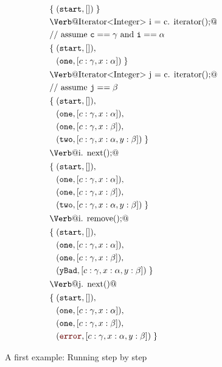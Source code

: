 \documentclass{sigplanconf} %
\newcommand{\error}{\ensuremath{\textcolor{darkred}{\mathtt{error}}}\xspace}
\newcommand{\start}{\ensuremath{\mathtt{start}}\xspace}
\theoremstyle{definition}
\theoremstyle{remark}
\begin{document}
\begin{figure}
{\def\s#1{\text{\Verb@#1@}}
 \def\m#1{\PY{n+na}{#1}}
 \def\t#1{\mathtt{#1}}
\begin{align*}
&\{\;(\start,[])\;\} \\
&\s{Iterator<Integer> i = c.\m{iterator}();} \\
&\text{// assume ${\tt c}==\gamma$ and ${\tt i}==\alpha$ } \\
& \begin{aligned}
  \{\;&(\start,[]),\\
      &(\t{one},[c:\gamma,x:\alpha])\;\}
  \end{aligned}\\
&\s{Iterator<Integer> j = c.\m{iterator}();} \\
&\text{// assume ${\tt j}==\beta$} \\
& \begin{aligned}
  \{\;&(\start,[]),\\
      &(\t{one},[c:\gamma,x:\alpha]),\\
      &(\t{one},[c:\gamma,x:\beta]),\\
      &(\t{two},[c:\gamma,x:\alpha,y:\beta])\;\}
  \end{aligned}\\
&\s{i.\m{next}();} \\
& \begin{aligned}
  \{\;&(\start,[]),\\
      &(\t{one},[c:\gamma,x:\alpha]),\\
      &(\t{one},[c:\gamma,x:\beta]),\\
      &(\t{two},[c:\gamma,x:\alpha,y:\beta])\;\}
  \end{aligned}\\
&\s{i.\m{remove}();} \\
& \begin{aligned}
  \{\;&(\start,[]),\\
      &(\t{one},[c:\gamma,x:\alpha]),\\
      &(\t{one},[c:\gamma,x:\beta]),\\
      &(\t{yBad},[c:\gamma,x:\alpha,y:\beta])\;\}
  \end{aligned}\\
&\s{j.\m{next}()} \\
& \begin{aligned}
  \{\;&(\start,[]),\\
      &(\t{one},[c:\gamma,x:\alpha]),\\
      &(\t{one},[c:\gamma,x:\beta]),\\
      &(\error,[c:\gamma,x:\alpha,y:\beta])\;\}
  \end{aligned}\\
\end{align*}}
\caption{A first example: Running step by step}
\label{fig:first.steps}
\end{figure} %
\end{document}
